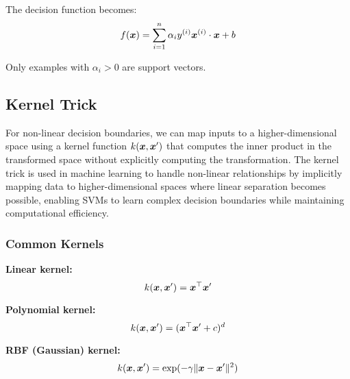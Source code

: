 The decision function becomes:
\begin{equation}
f(\boldsymbol{x}) = \sum_{i=1}^{n} \alpha_i y^{(i)} \boldsymbol{x}^{(i)} \cdot \boldsymbol{x} + b
\end{equation}

Only examples with $\alpha_i > 0$ are support vectors.

\subsection{Kernel Trick}

For non-linear decision boundaries, we can map inputs to a higher-dimensional space using a kernel function $k(\boldsymbol{x}, \boldsymbol{x}')$ that computes the inner product in the transformed space without explicitly computing the transformation. The kernel trick is used in machine learning to handle non-linear relationships by implicitly mapping data to higher-dimensional spaces where linear separation becomes possible, enabling SVMs to learn complex decision boundaries while maintaining computational efficiency.

\subsubsection{Common Kernels}

\textbf{Linear kernel:}
\begin{equation}
k(\boldsymbol{x}, \boldsymbol{x}') = \boldsymbol{x}^\top \boldsymbol{x}'
\end{equation}

\textbf{Polynomial kernel:}
\begin{equation}
k(\boldsymbol{x}, \boldsymbol{x}') = (\boldsymbol{x}^\top \boldsymbol{x}' + c)^d
\end{equation}

\textbf{RBF (Gaussian) kernel:}
\begin{equation}
k(\boldsymbol{x}, \boldsymbol{x}') = \exp(-\gamma \|\boldsymbol{x} - \boldsymbol{x}'\|^2)
\end{equation}

